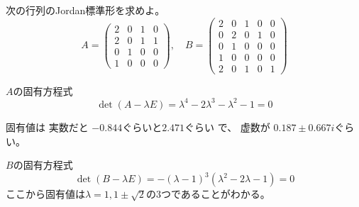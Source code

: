 \documentclass[12pt,b5paper]{ltjsarticle}
\begin{document}
\hrulefill

次の行列のJordan標準形を求めよ。
\begin{equation}
 A=
 \begin{pmatrix}
  2 & 0 & 1 & 0\\
  2 & 0 & 1 & 1\\
  0 & 1 & 0 & 0\\
  1 & 0 & 0 & 0
 \end{pmatrix}
 ,\quad
 B=
 \begin{pmatrix}
  2 & 0 & 1 & 0 & 0\\
  0 & 2 & 0 & 1 & 0\\
  0 & 1 & 0 & 0 & 0\\
  1 & 0 & 0 & 0 & 0\\
  2 & 0 & 1 & 0 & 1
 \end{pmatrix}
\end{equation}

\dotfill

$A$の固有方程式
\begin{equation}
 \det(A-\lambda E)= \lambda^4-2\lambda^3-\lambda^2-1=0
\end{equation}

固有値は
実数だと
 $-0.844$ぐらいと$2.471$ぐらい
 で、
 虚数が
 $0.187 \pm 0.667i$ぐらい。


\dotfill

$B$の固有方程式
\begin{equation}
 \det(B-\lambda E)=-(\lambda-1)^3(\lambda^2-2\lambda-1)=0
\end{equation}
ここから固有値は$\lambda = 1, 1\pm\sqrt{2}$の3つであることがわかる。
\end{document}
